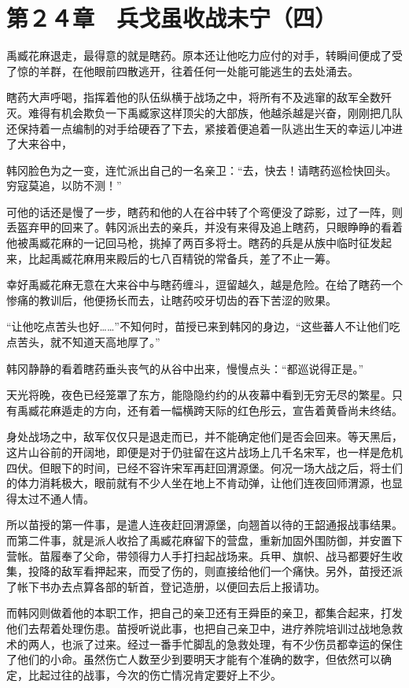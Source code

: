\section{第２４章　兵戈虽收战未宁（四）}

禹臧花麻退走，最得意的就是瞎药。原本还让他吃力应付的对手，转瞬间便成了受了惊的羊群，在他眼前四散逃开，往着任何一处能可能逃生的去处涌去。

瞎药大声呼喝，指挥着他的队伍纵横于战场之中，将所有不及逃窜的敌军全数歼灭。难得有机会欺负一下禹臧家这样顶尖的大部族，他越杀越是兴奋，刚刚把几队还保持着一点编制的对手给硬吞了下去，紧接着便追着一队逃出生天的幸运儿冲进了大来谷中，

韩冈脸色为之一变，连忙派出自己的一名亲卫：“去，快去！请瞎药巡检快回头。穷寇莫追，以防不测！”

可他的话还是慢了一步，瞎药和他的人在谷中转了个弯便没了踪影，过了一阵，则丢盔弃甲的回来了。韩冈派出去的亲兵，并没有来得及追上瞎药，只眼睁睁的看着他被禹臧花麻的一记回马枪，挑掉了两百多将士。瞎药的兵是从族中临时征发起来，比起禹臧花麻用来殿后的七八百精锐的常备兵，差了不止一筹。

幸好禹臧花麻无意在大来谷中与瞎药缠斗，逗留越久，越是危险。在给了瞎药一个惨痛的教训后，他便扬长而去，让瞎药咬牙切齿的吞下苦涩的败果。

“让他吃点苦头也好……”不知何时，苗授已来到韩冈的身边，“这些蕃人不让他们吃点苦头，就不知道天高地厚了。”

韩冈静静的看着瞎药垂头丧气的从谷中出来，慢慢点头：“都巡说得正是。”

天光将晚，夜色已经笼罩了东方，能隐隐约约的从夜幕中看到无穷无尽的繁星。只有禹臧花麻遁走的方向，还有着一幅横跨天际的红色彤云，宣告着黄昏尚未终结。

身处战场之中，敌军仅仅只是退走而已，并不能确定他们是否会回来。等天黑后，这片山谷前的开阔地，即便是对于仍驻留在这片战场上几千名宋军，也一样是危机四伏。但眼下的时间，已经不容许宋军再赶回渭源堡。何况一场大战之后，将士们的体力消耗极大，眼前就有不少人坐在地上不肯动弹，让他们连夜回师渭源，也显得太过不通人情。

所以苗授的第一件事，是遣人连夜赶回渭源堡，向翘首以待的王韶通报战事结果。而第二件事，就是派人收拾了禹臧花麻留下的营盘，重新加固外围防御，并安置下营帐。苗履奉了父命，带领得力人手打扫起战场来。兵甲、旗帜、战马都要好生收集，投降的敌军看押起来，而受了伤的，则直接给他们一个痛快。另外，苗授还派了帐下书办去点算各部的斩首，登记造册，以便回去后上报请功。

而韩冈则做着他的本职工作，把自己的亲卫还有王舜臣的亲卫，都集合起来，打发他们去帮着处理伤患。苗授听说此事，也把自己亲卫中，进疗养院培训过战地急救术的两人，也派了过来。经过一番手忙脚乱的急救处理，有不少伤员都幸运的保住了他们的小命。虽然伤亡人数至少到要明天才能有个准确的数字，但依然可以确定，比起过往的战事，今次的伤亡情况肯定要好上不少。

